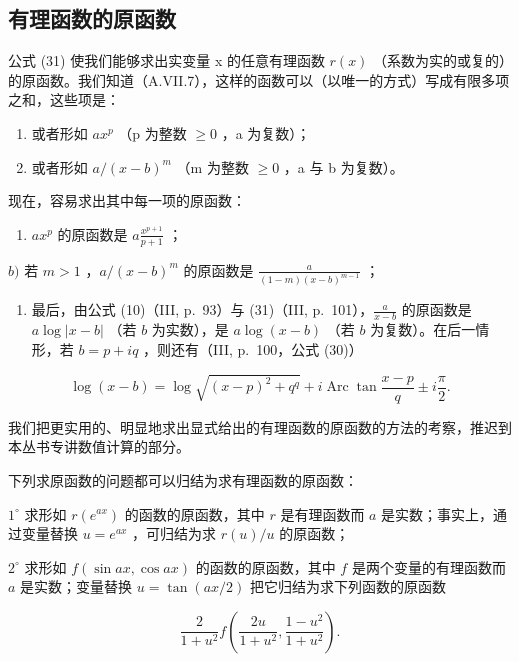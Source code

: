 \subsection{有理函数的原函数}

公式 (31) 使我们能够求出实变量 x 的任意有理函数 \(r(x)\) （系数为实的或复的）的原函数。我们知道（A.VII.7），这样的函数可以（以唯一的方式）写成有限多项之和，这些项是：

\begin{enumerate}
\def\labelenumi{\alph{enumi})}
\item
  或者形如 \(ax^{p}\) （p 为整数 \(\geqslant 0\) ，a 为复数）；
\item
  或者形如 \(a/(x - b)^{m}\) （m 为整数 \(\geqslant 0\) ，a 与 b 为复数）。
\end{enumerate}

现在，容易求出其中每一项的原函数：

\begin{enumerate}
\def\labelenumi{\alph{enumi})}
\tightlist
\item
  \(ax^p\) 的原函数是 \(a\frac{x^{p + 1}}{p + 1}\) ；
\end{enumerate}

\(b)\) 若 \(m > 1\) ，\(a / (x - b)^{m}\) 的原函数是 \(\frac{a}{(1 - m)(x - b)^{m - 1}}\) ；

\begin{enumerate}
\def\labelenumi{\alph{enumi})}
\setcounter{enumi}{2}
\tightlist
\item
  最后，由公式 (10)（III, p.~93）与 (31)（III, p.~101），\(\frac{a}{x - b}\) 的原函数是 \(a\log |x - b|\) （若 \(b\) 为实数），是 \(a\log (x - b)\) （若 \(b\) 为复数）。在后一情形，若 \(b = p + iq\) ，则还有（III, p.~100，公式 (30)）
\end{enumerate}

\[
\log (x - b) = \log \sqrt {(x - p) ^ {2} + q ^ {q}} + i \operatorname{Arc} \tan \frac {x - p}{q} \pm i \frac {\pi}{2}.
\]

我们把更实用的、明显地求出显式给出的有理函数的原函数的方法的考察，推迟到本丛书专讲数值计算的部分。

下列求原函数的问题都可以归结为求有理函数的原函数：

\(1^{\circ}\) 求形如 \(r(e^{ax})\) 的函数的原函数，其中 \(r\) 是有理函数而 \(a\) 是实数；事实上，通过变量替换 \(u = e^{ax}\) ，可归结为求 \(r(u) / u\) 的原函数；

\(2^{\circ}\) 求形如 \(f(\sin ax, \cos ax)\) 的函数的原函数，其中 \(f\) 是两个变量的有理函数而 \(a\) 是实数；变量替换 \(u = \tan(ax/2)\) 把它归结为求下列函数的原函数

\[
{\frac {2}{1 + u ^ {2}}} f \left({\frac {2 u}{1 + u ^ {2}}}, {\frac {1 - u ^ {2}}{1 + u ^ {2}}}\right).
\]

